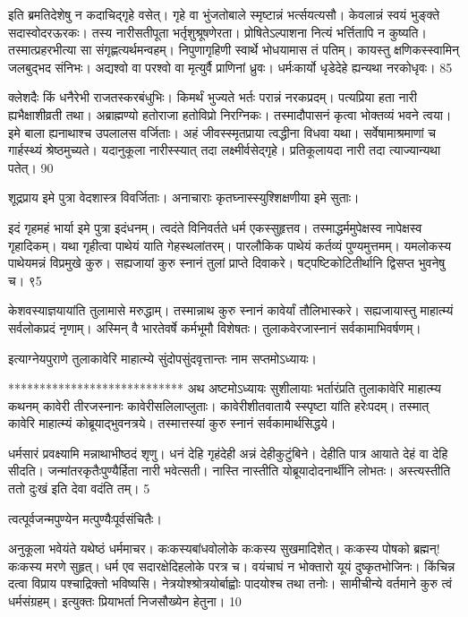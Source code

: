  
इति ब्रमतिदेशेषु न कदाचिद्गृहे वसेत्।
 गृहे वा भुंजतोबाले स्मृष्टान्नं भर्त्सयत्यसौ।
 केवलान्नं स्वयं भुङ्क्ते सदास्वोदरऊरकः।
 तस्य नारीसतीपूता भर्तृशुश्रूषणेरता।
 प्रोषितेऽल्पाशना नित्यं भर्त्तितापि न कुष्यति।
 तस्मात्प्रहरभीत्या सा संगृह्णत्यर्थमन्वहम्।
 निपुणागृहिणी स्वार्थे भोधयामास तं पतिम्।
 कायस्तु क्षणिकस्स्वामिन् जलबुद्भद संनिभः।
 अद्यश्वो वा परश्वो वा मृत्युर्वै प्राणिनां ध्रुवः।
 धर्मःकार्यो धृडेदेहे ह्यन्यथा नरकोधृवः।
 85

  क्लेशदैः किं धनैरेभी राजतस्करबंधुभिः।
 किमर्थं भुज्यते भर्तः परान्नं नरकप्रदम्।
 पत्यप्रिया हता नारी ह्यभैक्षाशीव्रती तथा।
 अब्राह्मण्यो हतोराजा हतोविप्रो निरग्निकः।
 तस्मादौपासनं कृत्वा भोक्तव्यं भवने त्वया।
 इमे बाला ह्यनाथाश्च उपलालस वर्जिताः।
 अहं जीवस्स्मृतप्राया त्वद्धीना विधवा यथा।
 सर्वेषामाश्रमाणां च गार्हस्थ्यं श्रेष्ठमुच्यते।
 यदानुकूला नारीस्स्यात् तदा लक्ष्मीर्वसेद्गृहे।
 प्रतिकूलायदा नारी तदा त्याज्यान्यथा पतेत्।
 90

  शूद्रप्राय इमे पुत्रा वेदशास्त्र विवर्जिताः।
 अनाचाराः कृतघ्नास्स्युश्शिक्षणीया इमे सुताः।
 
इदं गृहमहं भार्या इमे पुत्रा इदंधनम्।
 त्वदंते विनिवर्तते धर्म एकस्सुहृत्तव।
 तस्माद्धर्ममुपेक्षस्व नापेक्षस्व गृहादिकम्।
 यथा गृहीत्वा पाथेयं याति गेहस्थलांतरम्।
 पारलौकिक पाथेयं कर्तव्यं पुण्यमुत्तमम्।
 यमलोकस्य पाथेयमन्नं विप्रमुखे कुरु।
 सह्यजायां कुरु स्नानं तुलां प्राप्ते दिवाकरे।
 षट्पष्टिकोटितीर्थानि द्विसप्त भुवनेषु च।
 ९5

  केशवस्याज्ञयायांति तुलामासे मरुद्धाम्।
 तस्मान्नाथ कुरु स्नानं कावेर्यां तौलिभास्करे।
 सह्यजायास्तु माहात्म्यं सर्वलोकप्रदं नृणाम्।
 अस्मिन् वै भारतेवर्षे कर्मभूमौ विशेषतः।
 तुलाकवेरजास्नानं सर्वकामाभिवर्षणम्।
 
इत्याग्नेयपुराणे तुलाकावेरि माहात्म्ये सुंदोपसुंदवृत्तान्तः नाम सप्तमोऽध्यायः।

****************************
अथ अष्टमोऽध्यायः सुशीलायाः भर्तारंप्रति तुलाकावेरि माहात्म्य कथनम् कावेरी तीरजस्नानः कावेरीसलिलाप्लुताः।
 कावेरीशीतवातायै स्स्पृष्टा यांति हरेःपदम्।
 तस्मात् कावेरि माहात्म्यं कोब्रूयाद्भुवनत्रये।
 तस्मात्तस्यां कुरु स्नानं सर्वकामार्थसिद्धये।
 
धर्मसारं प्रवक्ष्यामि मन्नाथाभीष्ठदं शृणु।
 धनं देहि गृहंदेही अन्नं देहीकुटुंबिने।
 देहीति पात्र आयाते देहं वा देहि सीदति।
 जन्मांतरकृतैःपुण्यैर्हिता नारी भवेत्सती।
 नास्ति नास्तीति योब्रूयादोदनार्थीनि लोभतः।
 अस्त्यस्तीति ततो दुःखं इति देवा वदंति तम्।
 5

  त्वत्पूर्वजन्मपुण्येन मत्पुण्यैःपूर्वसंचितैः।
 
अनुकूला भवेयंते यथेष्ठं धर्ममाचर।
 कःकस्यबांधवोलोके कःकस्य सुखमादिशेत्।
 कःकस्य पोषको ब्रह्मन्! कःकस्य मरणे सुहृत्।
 धर्म एव सदारक्षेदिहलोके परत्र च।
 वयंचाघं न भोक्तारो यूयं दुष्कृतभोजिनः।
 किंचिन्न दत्वा विप्राय पश्चाद्रिक्तो भविष्यसि।
 नेत्रयोश्श्रोत्रयोर्बाह्वोः पादयोश्च तथा तनोः।
 सामीचीन्ये वर्तमाने कुरु त्वं धर्मसंग्रहम्।
 इत्युक्तः प्रियाभर्ता निजसौख्येन हेतुना।
 10

